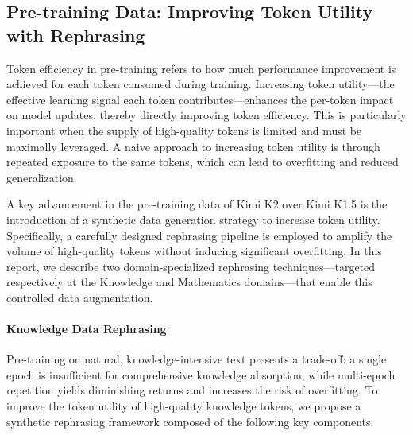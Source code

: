 \subsection{Pre-training Data: Improving Token Utility with Rephrasing}

Token efficiency in pre-training refers to how much performance improvement is achieved for each token consumed during training. Increasing token utility—the effective learning signal each token contributes—enhances the per-token impact on model updates, thereby directly improving token efficiency. 
This is particularly important when the supply of high-quality tokens is limited and must be maximally leveraged. A naive approach to increasing token utility is through repeated exposure to the same tokens, which can lead to overfitting and reduced generalization.

A key advancement in the pre-training data of Kimi K2 over Kimi K1.5 is the introduction of a synthetic data generation strategy to increase token utility. Specifically, a carefully designed rephrasing pipeline is employed to amplify the volume of high-quality tokens without inducing significant overfitting. In this report, we describe two domain-specialized rephrasing techniques—targeted respectively at the Knowledge and Mathematics domains—that enable this controlled data augmentation.



\paragraph{Knowledge Data Rephrasing}
Pre-training on natural, knowledge-intensive text presents a trade-off: a single epoch is insufficient for comprehensive knowledge absorption, while multi-epoch repetition yields diminishing returns and increases the risk of overfitting. To improve the token utility of high-quality knowledge tokens, we propose a synthetic rephrasing framework composed of the following key components:

